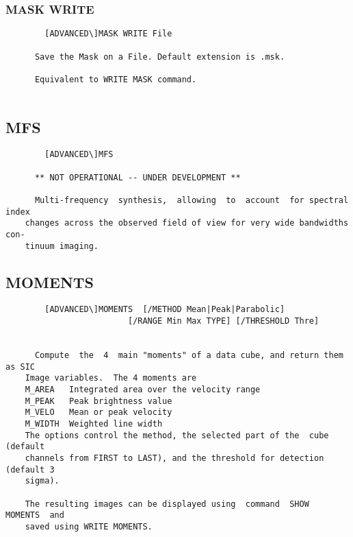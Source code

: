 \subsubsection{MASK WRITE}
\begin{verbatim}
        [ADVANCED\]MASK WRITE File

      Save the Mask on a File. Default extension is .msk.

      Equivalent to WRITE MASK command.


\end{verbatim}
\subsection{MFS}
\begin{verbatim}
        [ADVANCED\]MFS

      ** NOT OPERATIONAL -- UNDER DEVELOPMENT **

      Multi-frequency  synthesis,  allowing  to  account  for spectral index
    changes across the observed field of view for very wide bandwidths  con-
    tinuum imaging.

\end{verbatim}
\subsection{MOMENTS}
\begin{verbatim}
        [ADVANCED\]MOMENTS  [/METHOD Mean|Peak|Parabolic]
                         [/RANGE Min Max TYPE] [/THRESHOLD Thre]


      Compute  the  4  main "moments" of a data cube, and return them as SIC
    Image variables.  The 4 moments are
    M_AREA   Integrated area over the velocity range
    M_PEAK   Peak brightness value
    M_VELO   Mean or peak velocity
    M_WIDTH  Weighted line width
    The options control the method, the selected part of the  cube  (default
    channels from FIRST to LAST), and the threshold for detection (default 3
    sigma).

    The resulting images can be displayed using  command  SHOW  MOMENTS  and
    saved using WRITE MOMENTS.
\end{verbatim}
